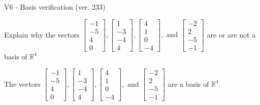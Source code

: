 \begin{exercise}
  \begin{exerciseTitle}V6 - Basis verification (ver. 233)\end{exerciseTitle}
  \begin{exerciseStatement}
    Explain why the vectors \(\left[\begin{array}{r}
-1 \\
-5 \\
4 \\
0
\end{array}\right] , \left[\begin{array}{r}
1 \\
-3 \\
-4 \\
4
\end{array}\right] , \left[\begin{array}{r}
4 \\
1 \\
0 \\
-4
\end{array}\right] , \text{ and } \left[\begin{array}{r}
-2 \\
2 \\
-5 \\
-1
\end{array}\right]\) are or are not a basis of \(\mathbb{R}^4\)	


  \end{exerciseStatement}
  \begin{exerciseAnswer}
   The vectors \(\left[\begin{array}{r}
-1 \\
-5 \\
4 \\
0
\end{array}\right] , \left[\begin{array}{r}
1 \\
-3 \\
-4 \\
4
\end{array}\right] , \left[\begin{array}{r}
4 \\
1 \\
0 \\
-4
\end{array}\right] , \text{ and } \left[\begin{array}{r}
-2 \\
2 \\
-5 \\
-1
\end{array}\right]\) 
  	 are  a basis of \(\mathbb{R}^4\).
  


  \end{exerciseAnswer}
\end{exercise}